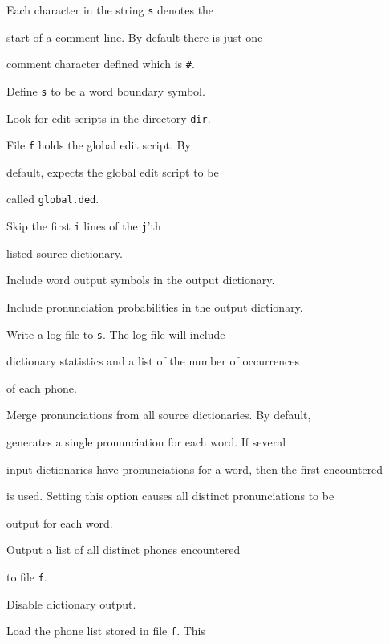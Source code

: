 \begin{optlist}





   Each character in the string \texttt{s} denotes the


      start of a comment line.  By default there is just one


      comment character defined which is \texttt{\#}.


    Define \texttt{s} to be a word boundary symbol.


   Look for edit scripts in the directory \texttt{dir}.


    File \texttt{f} holds the global edit script.  By


     default,  expects the global edit script to be


     called \texttt{global.ded}.


   Skip the first \texttt{i} lines of the \texttt{j}'th


     listed source dictionary.


   Include word output symbols in the output dictionary.


   Include pronunciation probabilities in the output dictionary.


   Write a log file to \texttt{s}.  The log file will include


     dictionary statistics and a list of the number of occurrences


     of each phone.


   Merge pronunciations from all source dictionaries.  By default,


     generates a single pronunciation for each word.  If several


    input dictionaries have pronunciations for a word, then the first encountered


    is used.  Setting this option causes all distinct pronunciations to be


    output for each word.


   Output a list of all distinct phones encountered 


     to file \texttt{f}.


   Disable dictionary output.


    Load the phone list stored in file \texttt{f}.  This



\end{optlist}
